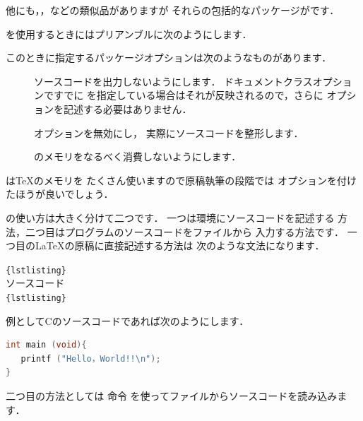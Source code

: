 他にも，，などの類似品がありますが
それらの包括的なパッケージがです．

を使用するときにはプリアンブルに次のようにします．

\begin{InTeX}
\usepackage[オプション]{listings}
\end{InTeX}

このときに指定するパッケージオプションは次のようなものがあります．

\begin{description}
 \item[] 
    ソースコードを出力しないようにします．
    ドキュメントクラスオプションですでに
    を指定している場合はそれが反映されるので，さらに
    オプションを記述する必要はありません．
 \item[] 
    オプションを無効にし，
    実際にソースコードを整形します．
 \item[] 
    {\laTEX}のメモリをなるべく消費しないようにします．
\end{description}

は{\TeX}のメモリを
たくさん使いますので原稿執筆の段階では
オプションを付けたほうが良いでしょう．

の使い方は大きく分けて二つです．
一つは環境にソースコードを記述する
方法，二つ目はプログラムのソースコードをファイルから
入力する方法です．
一つ目の{\LaTeX}の原稿に直接記述する方法は
次のような文法になります．
\begin{Syntax}
\verb|{lstlisting}| \\
ソースコード\\
\verb|{lstlisting}|
\end{Syntax}

例としてCのソースコードであれば次のようにします．

\begin{InTeX}
\begin{lstlisting}[language=C]
int main (void){
   printf ("Hello，World!!\n");
}
\end{lstlisting}
\end{InTeX}


二つ目の方法としては 命令
を使ってファイルからソースコードを読み込みます．
\begin{Syntax}
\end{Syntax}

